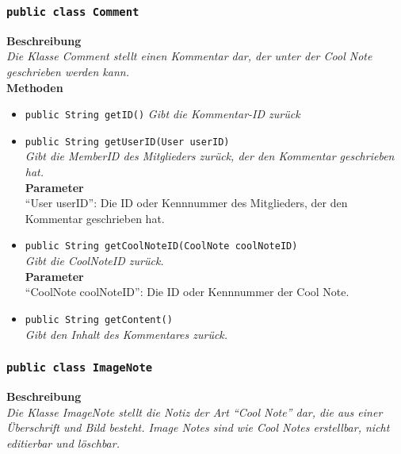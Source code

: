 \subsubsection{\texttt{public class Comment}}

	\textbf{Beschreibung} \\
	\textit{Die Klasse Comment stellt einen Kommentar dar, der unter der Cool Note geschrieben werden kann.} \\
	
	\textbf{Methoden}
	\begin{itemize}
		\item\texttt{public String getID()}
		\textit{Gibt die Kommentar-ID zurück}
		
		\item\texttt{{public String getUserID(User userID)}}\\
		\textit{Gibt die MemberID des Mitglieders zurück, der den Kommentar geschrieben hat.}\\
		\textbf{Parameter}\\
		“User userID”: Die ID oder Kennnummer des Mitglieders, der den Kommentar geschrieben hat.\\
		
		\item\texttt{{public String getCoolNoteID(CoolNote coolNoteID)}}\\
		\textit{Gibt die CoolNoteID zurück.}\\
		\textbf{Parameter}\\
		“CoolNote coolNoteID”: Die ID oder Kennnummer der Cool Note.\\
		
		\item\texttt{{public String getContent()}}\\
		\textit{Gibt den Inhalt des Kommentares zurück.}\\
	\end{itemize}

\subsubsection{\texttt{public class ImageNote}}

	\textbf{Beschreibung} \\
	\textit{Die Klasse ImageNote stellt die Notiz der Art “Cool Note” dar, die aus einer Überschrift und Bild besteht. Image Notes sind wie Cool Notes erstellbar, nicht editierbar und löschbar.} \\
	
